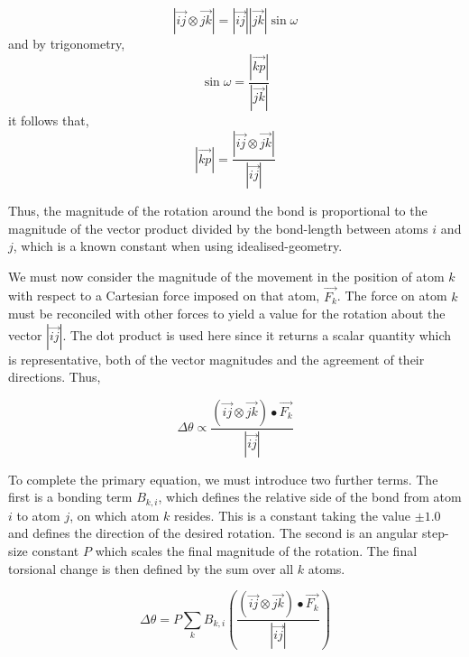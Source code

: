 \begin{equation}
\left\vert \vec{ij} \otimes \vec{jk} \right\vert = \left\vert \vec{ij} \right\vert  \left\vert  \vec{jk} \right\vert \sin\omega 
\end{equation}
and by trigonometry,
\begin{equation}
\sin\omega = \frac{ \left\vert \vec{kp} \right\vert }{ \left\vert \vec{jk} \right\vert }
\end{equation}
it follows that,
\begin{equation}
\left\vert \vec{kp} \right\vert = \frac{ \left\vert \vec{ij} \otimes \vec{jk} \right\vert }{ \left\vert \vec{ij} \right\vert }
\end{equation}

Thus, the magnitude of the rotation around the bond is proportional to the magnitude of the vector product divided by the bond-length between atoms $i$ and $j$, which is a known constant when using idealised-geometry.

We must now consider the magnitude of the movement in the position of atom $k$ with respect to a Cartesian force imposed on that atom, $\vec{F_k}$. The force on atom $k$ must be reconciled with other forces to yield a value for the rotation about the vector $\left\vert \vec{ij} \right\vert$. The  dot product is used here since it returns a scalar quantity which is representative, both of the vector magnitudes and the agreement of their directions. Thus,

\begin{equation}
\Delta\theta \propto \frac{ \left ( \vec{ij} \otimes \vec{jk} \right ) \bullet \vec{F_k} }{\left\vert \vec{ij} \right\vert }
\end{equation}

To complete the primary equation, we must introduce two further terms. The first is a bonding term $B_{k,i}$, which defines the relative side  of the bond from atom $i$ to atom $j$, on which atom $k$ resides. This is a constant taking the value $\pm 1.0$ and defines the direction of the desired rotation. The second is an angular step-size constant $P$ which scales the final magnitude of the rotation. The final torsional change is then defined by the sum over all $k$ atoms.

\begin{equation}
\Delta\theta =P\sum_k B_{k,i} \left( \frac{ \left( \vec{ij} \otimes \vec{jk} \right) \bullet \vec{F_k} }{\left\vert \vec{ij} \right\vert } \right)
\label{eqn:prearcus:primary_torsional}
\end{equation}

